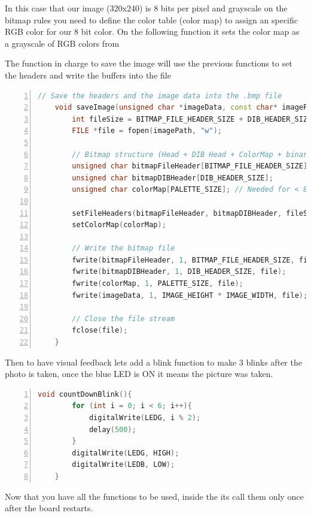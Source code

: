 In this case that our image (320x240) is 8 bits per pixel and grayscale on the bitmap rules you need to define the color table (color map) to assign an specific RGB color for our 8 bit color. On the following function it sets the color map as a grayscale of RGB colors from  \cite{portentaCameraToBitmap:2024}

The function in charge to save the image will use the previous functions to set the headers and write the buffers into the file  \cite{portentaCameraToBitmap:2024}

\begin{lstlisting}[language=C++, frame=single, numbers=left, basicstyle=\ttfamily\small]
	// Save the headers and the image data into the .bmp file
	void saveImage(unsigned char *imageData, const char* imagePath){
		int fileSize = BITMAP_FILE_HEADER_SIZE + DIB_HEADER_SIZE + IMAGE_WIDTH * IMAGE_HEIGHT;
		FILE *file = fopen(imagePath, "w");
		
		// Bitmap structure (Head + DIB Head + ColorMap + binary image)
		unsigned char bitmapFileHeader[BITMAP_FILE_HEADER_SIZE];
		unsigned char bitmapDIBHeader[DIB_HEADER_SIZE];
		unsigned char colorMap[PALETTE_SIZE]; // Needed for < 8bpp grayscale bitmaps    
		
		setFileHeaders(bitmapFileHeader, bitmapDIBHeader, fileSize);
		setColorMap(colorMap);
		
		// Write the bitmap file
		fwrite(bitmapFileHeader, 1, BITMAP_FILE_HEADER_SIZE, file);
		fwrite(bitmapDIBHeader, 1, DIB_HEADER_SIZE, file);
		fwrite(colorMap, 1, PALETTE_SIZE, file);
		fwrite(imageData, 1, IMAGE_HEIGHT * IMAGE_WIDTH, file);
		
		// Close the file stream
		fclose(file);
	}
\end{lstlisting}

Then to have visual feedback lets add a blink function to make 3 blinks after the photo is taken, once the blue LED is ON it means the picture was taken. \cite{portentaCameraToBitmap:2024}

\begin{lstlisting}[language=C++, frame=single, numbers=left, basicstyle=\ttfamily\small]
	void countDownBlink(){
		for (int i = 0; i < 6; i++){
			digitalWrite(LEDG, i % 2);
			delay(500);
		}
		digitalWrite(LEDG, HIGH);
		digitalWrite(LEDB, LOW);
	}
\end{lstlisting}

Now that you have all the functions to be used, inside the  its call them only once after the board restarts. \cite{portentaCameraToBitmap:2024}

